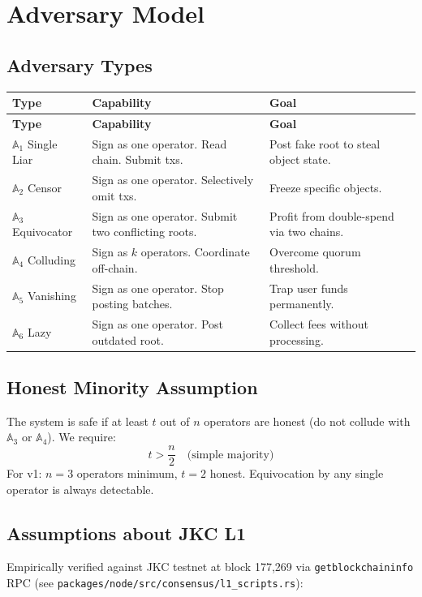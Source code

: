 \documentclass[a4paper,11pt]{article}
\begin{document}
\section{Adversary Model}

\subsection{Adversary Types}

\begin{longtable}{llp{7cm}}
\toprule
\textbf{Type} & \textbf{Capability} & \textbf{Goal} \\
\midrule
\endfirsthead
\toprule
\textbf{Type} & \textbf{Capability} & \textbf{Goal} \\
\midrule
\endhead
$\mathbb{A}_1$ Single Liar & Sign as one operator. Read chain. Submit txs. & Post fake root to steal object state. \\
$\mathbb{A}_2$ Censor & Sign as one operator. Selectively omit txs. & Freeze specific objects. \\
$\mathbb{A}_3$ Equivocator & Sign as one operator. Submit two conflicting roots. & Profit from double-spend via two chains. \\
$\mathbb{A}_4$ Colluding & Sign as $k$ operators. Coordinate off-chain. & Overcome quorum threshold. \\
$\mathbb{A}_5$ Vanishing & Sign as one operator. Stop posting batches. & Trap user funds permanently. \\
$\mathbb{A}_6$ Lazy & Sign as one operator. Post outdated root. & Collect fees without processing. \\
\bottomrule
\end{longtable}

\subsection{Honest Minority Assumption}

The system is safe if at least $t$ out of $n$ operators are honest (do not collude with $\mathbb{A}_3$ or $\mathbb{A}_4$). We require:
\[
    t > \frac{n}{2} \quad \text{(simple majority)}
\]
For v1: $n = 3$ operators minimum, $t = 2$ honest. Equivocation by any single operator is always detectable.

\subsection{Assumptions about JKC L1}

Empirically verified against JKC testnet at block 177{,}269 via \texttt{getblockchaininfo} RPC (see \texttt{packages/node/src/consensus/l1\_scripts.rs}):
\end{document}
